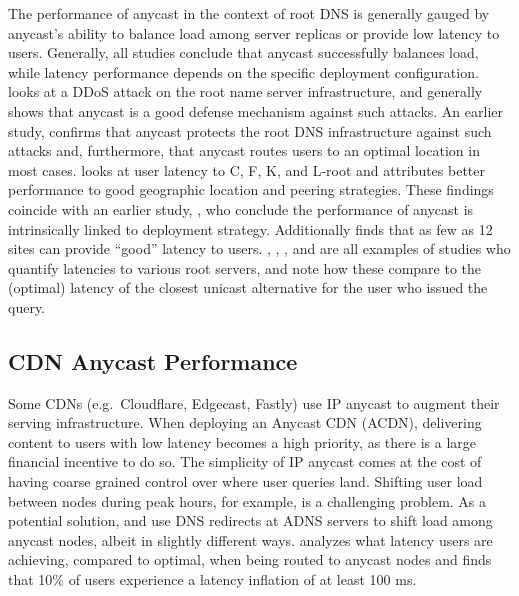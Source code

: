 \documentclass[sigconf,nonacm,10pt]{acmart}
\begin{document}
The performance of anycast in the context of root DNS is generally
gauged by anycast's ability to balance load among server replicas or
provide low latency to users. Generally, all studies conclude that
anycast successfully balances load, while latency performance depends on
the specific deployment configuration. \cite{moura2016anycast} looks at
a DDoS attack on the root name server infrastructure, and generally
shows that anycast is a good defense mechanism against such attacks. An
earlier study, \cite{sarat2006use} confirms that anycast protects the
root DNS infrastructure against such attacks and, furthermore, that
anycast routes users to an optimal location in most cases.
\cite{de2017anycast} looks at user latency to C, F, K, and L-root and
attributes better performance to good geographic location and peering
strategies. These findings coincide with an earlier study,
\cite{ballani2006measurement}, who conclude the performance of anycast
is intrinsically linked to deployment strategy. Additionally
\cite{de2017anycast} finds that as few as 12 sites can provide ``good''
latency to users. \cite{li_levin_spring_bhattacharjee_2018},
\cite{colitti2006evaluating}, \cite{de2017anycast}, and
\cite{liang2013measuring} are all examples of studies who quantify
latencies to various root servers, and note how these compare to the
(optimal) latency of the closest unicast alternative for the user who
issued the query.

\subsection{CDN Anycast Performance}\label{cdn-anycast-performance}

Some CDNs (e.g.~Cloudflare, Edgecast, Fastly) use IP anycast to augment
their serving infrastructure. When deploying an Anycast CDN (ACDN),
delivering content to users with low latency becomes a high priority, as
there is a large financial incentive to do so. The simplicity of IP
anycast comes at the cost of having coarse grained control over where
user queries land. Shifting user load between nodes during peak hours,
for example, is a challenging problem. As a potential solution,
\cite{alzoubi2011practical} and \cite{flavel2015fastroute} use DNS
redirects at ADNS servers to shift load among anycast nodes, albeit in
slightly different ways. \cite{calder2015analyzing} analyzes what
latency users are achieving, compared to optimal, when being routed to
anycast nodes and finds that 10\% of users experience a latency
inflation of at least 100 ms.
\end{document}
